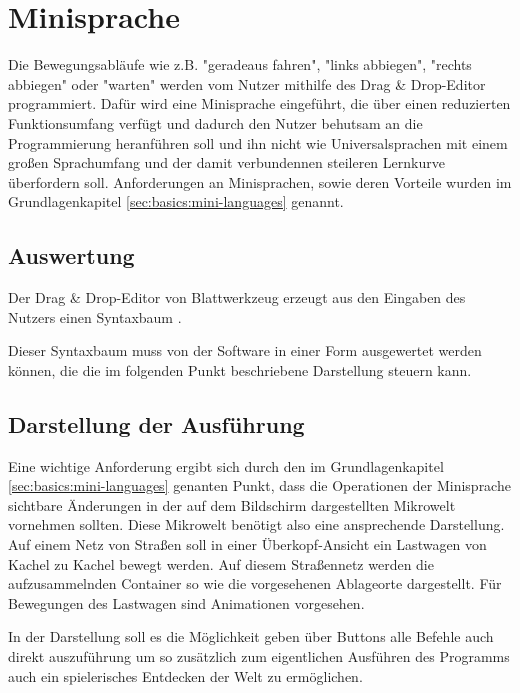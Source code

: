 \section{Minisprache}
\label{sec:requirements:program}

Die Bewegungsabläufe wie z.B. "geradeaus fahren", "links abbiegen", "rechts abbiegen" oder "warten" werden vom Nutzer mithilfe des Drag \& Drop-Editor programmiert. Dafür wird eine Minisprache eingeführt, die über einen reduzierten Funktionsumfang verfügt und dadurch den Nutzer behutsam an die Programmierung heranführen soll und ihn nicht wie Universalsprachen mit einem großen Sprachumfang und der damit verbundennen steileren Lernkurve überfordern soll. Anforderungen an Minisprachen, sowie deren Vorteile wurden im Grundlagenkapitel \ref{sec:basics:mini-languages} genannt.

\subsection{Auswertung}
\label{sec:requirements:world:compile-interpret}

Der Drag \& Drop-Editor von Blattwerkzeug  erzeugt aus den Eingaben des Nutzers einen Syntaxbaum .

Dieser Syntaxbaum muss von der Software in einer Form ausgewertet werden können, die die im folgenden Punkt beschriebene Darstellung steuern kann. \TODO{}

\subsection{Darstellung der Ausführung}
\label{sec:requirements:world:display}

Eine wichtige Anforderung ergibt sich durch den im Grundlagenkapitel \ref{sec:basics:mini-languages} genanten Punkt, dass die Operationen der Minisprache sichtbare Änderungen in der auf dem Bildschirm dargestellten Mikrowelt vornehmen sollten. Diese Mikrowelt benötigt also eine ansprechende Darstellung. Auf einem Netz von Straßen soll in einer Überkopf-Ansicht ein Lastwagen von Kachel zu Kachel bewegt werden. Auf diesem Straßennetz werden die aufzusammelnden Container so wie die vorgesehenen Ablageorte dargestellt. Für Bewegungen des Lastwagen sind Animationen vorgesehen.

In der Darstellung soll es die Möglichkeit geben über Buttons alle Befehle auch direkt auszuführung um so zusätzlich zum eigentlichen Ausführen des Programms auch ein spielerisches Entdecken der Welt zu ermöglichen. 
